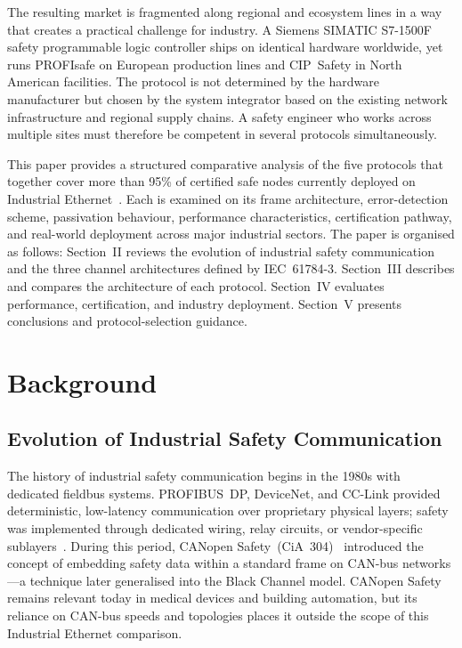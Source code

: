 \documentclass[conference]{IEEEtran}
\begin{document}
The resulting market is fragmented along regional and ecosystem lines in
a way that creates a practical challenge for industry. A Siemens SIMATIC
S7-1500F safety programmable logic controller ships on identical hardware
worldwide, yet runs PROFIsafe on European production lines and CIP~Safety
in North American facilities. The protocol is not determined by the
hardware manufacturer but chosen by the system integrator based on the
existing network infrastructure and regional supply chains. A safety
engineer who works across multiple sites must therefore be competent in
several protocols simultaneously.

This paper provides a structured comparative analysis of the five
protocols that together cover more than 95\% of certified safe nodes
currently deployed on Industrial Ethernet~\cite{IEC617843,SiemensSafety}.
Each is examined on its frame architecture, error-detection scheme,
passivation behaviour, performance characteristics, certification pathway,
and real-world deployment across major industrial sectors. The paper
is organised as follows: Section~II reviews the evolution of industrial
safety communication and the three channel architectures defined by
IEC~61784-3. Section~III describes and compares the architecture of each
protocol. Section~IV evaluates performance, certification, and industry
deployment. Section~V presents conclusions and protocol-selection guidance.

\section{Background}

\subsection{Evolution of Industrial Safety Communication}

The history of industrial safety communication begins in the 1980s with
dedicated fieldbus systems. PROFIBUS~DP, DeviceNet, and CC-Link provided
deterministic, low-latency communication over proprietary physical layers;
safety was implemented through dedicated wiring, relay circuits, or
vendor-specific sublayers~\cite{Pigan2008}. During this period, CANopen
Safety~(CiA~304)~\cite{CiACanopen} introduced the concept of embedding
safety data within a standard frame on CAN-bus networks---a technique
later generalised into the Black Channel model. CANopen Safety remains
relevant today in medical devices and building automation, but its
reliance on CAN-bus speeds and topologies places it outside the scope
of this Industrial Ethernet comparison.
\end{document}
